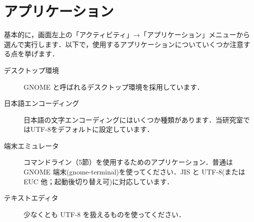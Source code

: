 \documentclass[main]{subfiles}
\begin{document}
\chapter{アプリケーション}

基本的に，画面左上の「アクティビティ」→「アプリケーション」メニューから選んで実行します．以下で，使用するアプリケーションについていくつか注意する点を挙げます．

\begin{description}
    \item[デスクトップ環境] GNOME と呼ばれるデスクトップ環境を採用しています．

    \item[日本語エンコーディング] 日本語の文字エンコーディングにはいくつか種類があります．当研究室ではUTF-8をデフォルトに設定しています．

    
    \item[端末エミュレータ] コマンドライン（5節）を使用するためのアプリケーション．普通は GNOME 端末(gnome-terminal)を使ってください．JIS と UTF-8(または EUC 他；起動後切り替え可)に対応しています．

    \item[テキストエディタ] 少なくとも UTF-8 を扱えるものを使ってください．

\end{description}
\end{document}
